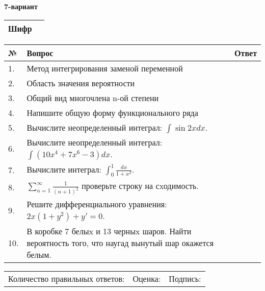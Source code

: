 \documentclass{article}
\begin{document}
  \egroup
  
  \newpage
  
  
  \textbf{7-вариант}\\
  
  \bgroup
  \def\arraystretch{1.6} %
  
  \begin{tabular}{|m{5.7cm}|m{9.5cm}|}
  \hline
  Шифр & \\
  \hline
  \end{tabular}
  
  \vspace{1cm}
  
  \begin{tabular}{|m{0.7cm}|m{10cm}|m{4cm}|}
  \hline
  № & Вопрос & Ответ \\
  \hline
  1. & Метод интегрирования заменой переменной &  \\
  \hline
  2. & Область значения вероятности &  \\
  \hline
  3. & Общий вид многочлена n-ой степени &  \\
  \hline
  4. & Напишите общую форму функционального ряда &  \\
  \hline
  5. & Вычислите неопределенный интеграл: \(\int{\sin{2x}dx}\). &  \\
  \hline
  6. & Вычислите неопределенный интеграл: \(\int{\left( 10x^{4} + 7x^{6} - 3 \right)dx}\). &  \\
  \hline
  7. & Вычислите интеграл: \(\int_{0}^{1}\frac{dx}{1 + x^{2}}\). &  \\
  \hline
  8. & \(\sum_{n = 1}^{\infty}\frac{1}{(n + 1)^{2}}\) проверьте строку на сxодимость. &  \\
  \hline
  9. & Решите дифференциального уравнения: \(2x\left( 1 + y^{2} \right) + y' = 0\). &  \\
  \hline
  10. & В коробке 7 белыx и 13 черныx шаров. Найти вероятность того, что наугад вынутый шар окажется белым. &  \\
  \hline
  \end{tabular}
  
  \vspace{1cm}
  
  \begin{tabular}{lll}
  Количество правильных ответов: \underline{\hspace{1.5cm}} & 
  Оценка: \underline{\hspace{1.5cm}} & 
  Подпись: \underline{\hspace{2cm}} \\
  \end{tabular}
  
\end{document}
